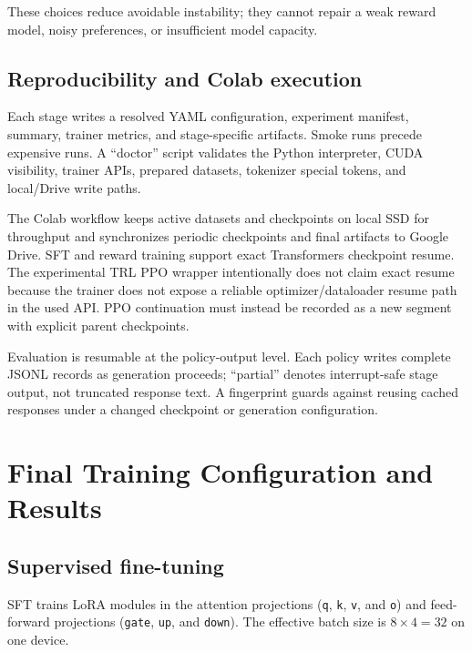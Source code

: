 \documentclass[11pt]{article}
\newcommand{\trl}{\textsc{TRL}}
\begin{document}
These choices reduce avoidable instability; they cannot repair a weak reward
model, noisy preferences, or insufficient model capacity.

\subsection{Reproducibility and Colab execution}

Each stage writes a resolved YAML configuration, experiment manifest, summary,
trainer metrics, and stage-specific artifacts. Smoke runs precede expensive
runs. A ``doctor'' script validates the Python interpreter, CUDA visibility,
trainer APIs, prepared datasets, tokenizer special tokens, and local/Drive
write paths.

The Colab workflow keeps active datasets and checkpoints on local SSD for
throughput and synchronizes periodic checkpoints and final artifacts to Google
Drive. SFT and reward training support exact Transformers checkpoint resume.
The experimental \trl{} PPO wrapper intentionally does not claim exact resume
because the trainer does not expose a reliable optimizer/dataloader resume
path in the used API. PPO continuation must instead be recorded as a new
segment with explicit parent checkpoints.

Evaluation is resumable at the policy-output level. Each policy writes
complete JSONL records as generation proceeds; ``partial'' denotes
interrupt-safe stage output, not truncated response text. A fingerprint guards
against reusing cached responses under a changed checkpoint or generation
configuration.

\section{Final Training Configuration and Results}

\subsection{Supervised fine-tuning}

SFT trains LoRA modules in the attention projections
(\texttt{q}, \texttt{k}, \texttt{v}, and \texttt{o}) and feed-forward
projections (\texttt{gate}, \texttt{up}, and \texttt{down}). The effective
batch size is $8\times 4=32$ on one device.
\end{document}
